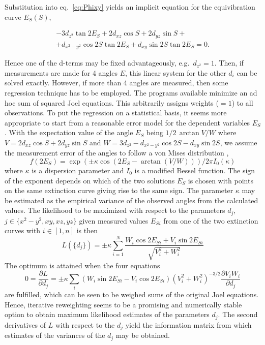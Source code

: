 \documentclass{article}
\begin{document}
Substitution into eq.\ \ref{eq:Phixy} yields an implicit equation for the equivibration curve $E_S(S)$, 

\begin{eqnarray*}
	-3d_{z^2}\tan 2E_S+2d_{xz}\cos S+ 2d_{yz}\sin S+\\+ d_{x^2-y^2}\cos 2 S\tan 2E_S+d_{xy}\sin 2S\tan 2E_S=0.
\end{eqnarray*}

Hence one of the  d-terms may be fixed advantageously, e.g.\ $d_{z^2}=1$. 
Then, if measurements are made for 4 angles $E$, this linear system for the other $d_i$ can be solved exactly. 
However, if more than 4 angles are measured, then some regression technique has to be employed.
The programs available \cite{bloss1973computer,bartelmehs1992excalibr} minimize an ad hoc sum of squared Joel equations. 
This arbitrarily assigns weights ($=1$) to all observations. 
To put the regression on a statistical basis, it seems more appropriate to start from a reasonable error model for the dependent variables $E_S$. 
With the expectation value of the angle $E_S$ being $1/2\,\arctan{V/W}$ where $V=2d_{xz}\cos S+ 2d_{yz}\sin S$ and $W=3d_{z^2}-d_{x^2-y^2}\cos 2 S-d_{xy}\sin 2S$, 
we assume the measurement error of the angles to follow a von Mises distribution \cite{evans2000statistical}, 
\[
	f(2E_S)= \exp(\pm\kappa \cos(2E_S-\arctan(V/W)))/2\pi I_0(\kappa)
\]
where $\kappa$ is a dispersion parameter and $I_0$ is a modified Bessel function.
The sign of the exponent depends on which of the two solutions $E_S$ is chosen with points on the same extinction curve giving rise to the same sign. 
The parameter $\kappa$ may be estimated as the empirical variance of the observed angles from the calculated values. 
The likelihood to be maximized with respect to the parameters $d_j$, $j\in \{x^2-y^2,xy, xz, yz\}$ given measured values $E_{Si}$ from one of the two extinction curves with $i\in [1,n]$  is then
\[
	\label{eq:L}
	L(\{d_j\})=\pm\kappa\sum_{i=1}^N \frac{W_i\cos 2E_{Si} +V_i \sin 2E_{Si} }{\sqrt{V_i^2+W_i^2}} 
\]
The optimum is attained when the four equations 
\[
	0=\frac{\partial L}{\partial d_j}=\pm \kappa\sum_i \left(W_i \sin 2E_{Si}-V_i \cos{2E_{Si}}\right) (V_i^2+W_i^2)^{-3/2} \frac{\partial V_iW_i}{\partial d_j}
\]
are fulfilled, which can be seen to be weighed sums of the original Joel equations. 
Hence, iterative reweighting seems to be a promising and numerically stable option to obtain maximum likelihood estimates of the parameters $d_j$. 
The second derivatives of $L$ with respect to the $d_j$ yield the information matrix from which estimates of the variances of the $d_j$ may be obtained. 
\end{document}
